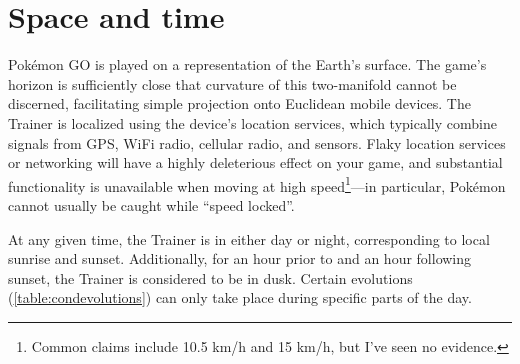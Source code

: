 \chapter{Space and time\label{chap:timespace}}
Pokémon GO is played on a representation of the Earth's surface.
The game's horizon is sufficiently close that curvature of this two-manifold
 cannot be discerned, facilitating simple projection onto Euclidean mobile devices.
The Trainer is localized using the device's location services, which typically
 combine signals from GPS, WiFi radio, cellular radio, and sensors.
Flaky location services or networking will have a highly deleterious effect on your game,
 and substantial functionality is unavailable when moving at high speed\footnote{Common
 claims include 10.5 km/h and 15 km/h, but I've seen no evidence.}---in particular,
 Pokémon cannot usually be caught while ``speed locked''.

At any given time, the Trainer is in either day or night, corresponding to
 local sunrise and sunset.
Additionally, for an hour prior to and an hour following sunset, the
 Trainer is considered to be in dusk.
Certain evolutions (\autoref{table:condevolutions}) can only take place during
 specific parts of the day.

